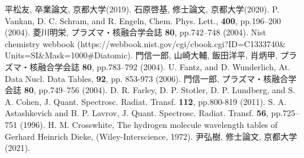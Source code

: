 \begin{thebibliography}{99}
     平松友, 卒業論文, 京都大学(2019).
     石原啓基, 修士論文, 京都大学(2020).
     P. Vankan, D. C. Schram, and R. Engeln, Chem. Phys. Lett., \textbf{400}, pp.196–200 (2004).
     菱川明栄, プラズマ・核融合学会誌 \textbf{80}, pp.742–748 (2004).
     Nist chemistry webbook (https://webbook.nist.gov/cgi/cbook.cgi?ID=C1333740\&\\Units=SI\&Mask=1000\#Diatomic).
     門信一郎, 山崎大輔, 飯田洋平, 肖炳甲, プラズマ・核融合学会誌 \textbf{80}, pp.783–792 (2004).
     U. Fantz, and D. Wunderlich, At. Data Nucl. Data Tables, \textbf{92}, pp. 853-973 (2006).
     門信一郎, プラズマ・核融合学会誌 \textbf{80}, pp.749–756 (2004).
     D. R. Farley, D. P. Stotler, D. P. Lundberg, and S. A. Cohen, J. Quant. Spectrosc. Radiat. Transf. \textbf{112}, pp.800-819 (2011).
     S. A. Astashkevich and B. P. Lavrov, J. Quant. Spectrosc. Radiat. Transf. \textbf{56}, pp.725–751 (1996).
     H. M. Crosswhite, The hydrogen molecule wavelength tables of Gerhard Heinrich Dieke, (Wiley-Interscience, 1972).
     尹弘樹, 修士論文, 京都大学(2021).
\end{thebibliography}